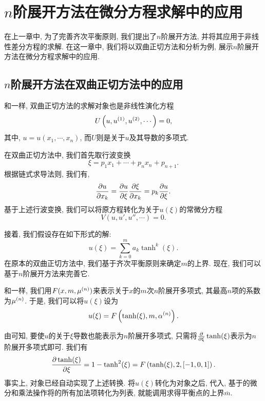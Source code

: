 \chapter{$n$阶展开方法在微分方程求解中的应用}\label{ch05}
在上一章中, 为了完善齐次平衡原则, 我们提出了$n$阶展开方法, 并将其应用于非线性差分方程的求解. 在这一章中, 我们将以双曲正切方法和\Painleve{}分析为例, 展示$n$阶展开方法在微分方程求解中的应用.

\section{$n$阶展开方法在双曲正切方法中的应用}
和一样, 双曲正切方法的求解对象也是非线性演化方程
\begin{equation}
    U\left(u,u^{(1)},u^{(2)},\cdots\right)=0,
\end{equation}
其中, $u=u(x_1,\cdots,x_n)$, 而$U$则是关于$u$及其导数的多项式. 

在双曲正切方法中, 我们首先取行波变换 
\begin{equation}
    \xi = p_1 x_1 +\cdots + p_n x_n + p_{n+1}.  \label{tanh-tw}
\end{equation}
根据链式求导法则, 我们有,
\begin{equation}
    \frac{\partial u}{\partial x_k}=\frac{\partial u}{\partial \xi}\frac{\partial \xi}{\partial x_k}=p_k\frac{\partial u}{\partial \xi}.
\end{equation}
基于上述行波变换, 我们可以将原方程转化为关于$u(\xi)$的常微分方程
\begin{equation}
    V(u,u',u'',\cdots)=0. \label{odeq}
\end{equation}

接着, 我们假设存在如下形式的解:
\begin{equation}
    u(\xi)=\sum_{k=0}^m{a_k \tanh^k(\xi)}. \label{tanh-poly}
\end{equation}
在原本的双曲正切方法中, 我们基于齐次平衡原则来确定$m$的上界. 现在, 我们可以基于$n$阶展开方法来完善它. 

和一样, 我们用$F(x,m,\mu^{(n)})$来表示关于$x$的$m$次$n$阶展开多项式, 其最高$n$项的系数为$\mu^{(n)}$. 于是, 我们可以将$u(\xi)$设为
\begin{equation}
    u(\xi)=F\left(\tanh(\xi),m,\alpha^{(n)}\right).
\end{equation}

由可知, 要使$u$的关于$\xi$导数也能表示为$n$阶展开多项式, 只需将$\frac{\partial}{\partial \xi}\tanh(\xi)$表示为$n$阶展开多项式即可. 我们有 
\begin{equation}
    \frac{\partial \tanh(\xi)}{\partial \xi}=1-\tanh^2(\xi)=F\left(\tanh(\xi),2,[-1,0,1]\right).
\end{equation}
事实上, 对象已经自动实现了上述转换. 将$u(\xi)$转化为对象之后, 代入, 基于的微分和乘法操作将的所有加法项转化为列表, 就能调用求得平衡点的上界$\overline{m}$.

